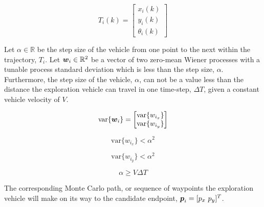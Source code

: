 \begin{equation}
T_{i}(k) = \begin{bmatrix} x_i(k) \\ y_i(k) \\ \theta_i(k) \end{bmatrix}
\end{equation}

Let $\alpha \in \mathbb{R}$ be the step size of the vehicle from one point to the next within the trajectory, $T_i$. Let ${\it{\boldsymbol{w}}}_i \in \mathbb{R}^2$ be a vector of two zero-mean Wiener processes with a tunable process standard deviation which is less than the step size, $\alpha$. Furthermore, the step size of the vehicle, $\alpha$, can not be a value less than the distance the exploration vehicle can travel in one time-step, $\Delta T$, given a constant vehicle velocity of $V$.

\begin{equation}
\text{var}\{{\it{\boldsymbol{w}}}_i\} = \begin{bmatrix} \text{var}\{w_{i_x}\} \\ \text{var}\{w_{i_y}\} \end{bmatrix}
\end{equation}

\begin{equation}
\text{var}\{w_{i_x}\} < \alpha^2
\end{equation}

\begin{equation}
\text{var}\{w_{i_y}\} < \alpha^2
\end{equation}

\begin{equation}
\alpha \geq V \Delta T
\end{equation}

The corresponding Monte Carlo path, or sequence of waypoints the exploration vehicle will make on its way to the candidate endpoint, ${\it{\boldsymbol{p}}}_i = [p_x\ p_y]^T$.

